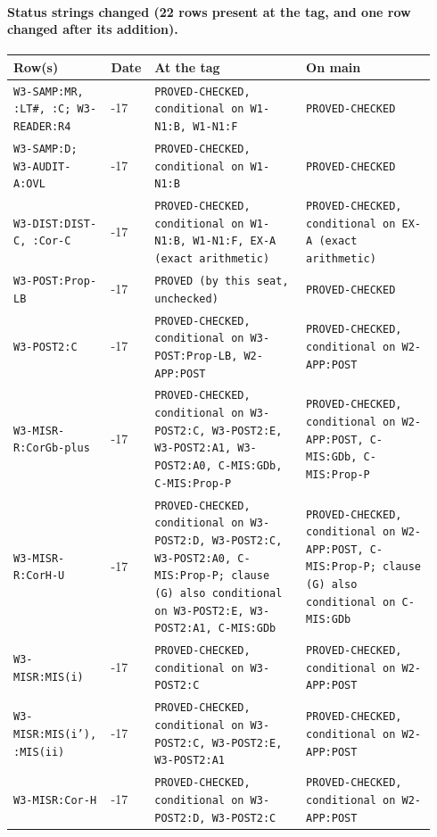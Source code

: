 \paragraph{Status strings changed (22 rows present at the tag, and one row changed after its addition).}
{\footnotesize\begin{longtable}{@{}>{\raggedright\arraybackslash}p{0.22\linewidth}>{\raggedright\arraybackslash}p{0.07\linewidth}>{\raggedright\arraybackslash}p{0.35\linewidth}>{\raggedright\arraybackslash}p{0.3\linewidth}@{}}
\toprule Row(s) & Date & At the tag & On main \\ \midrule
\texttt{W3-SAMP:MR, :LT\#, :C; W3-READER:R4} & 11-17 & \texttt{PROVED-CHECKED, conditional on W1-N1:B, W1-N1:F} & \texttt{PROVED-CHECKED} \\
\texttt{W3-SAMP:D; W3-AUDIT-A:OVL} & 11-17 & \texttt{PROVED-CHECKED, conditional on W1-N1:B} & \texttt{PROVED-CHECKED} \\
\texttt{W3-DIST:DIST-C, :Cor-C} & 11-17 & \texttt{PROVED-CHECKED, conditional on W1-N1:B, W1-N1:F, EX-A (exact arithmetic)} & \texttt{PROVED-CHECKED, conditional on EX-A (exact arithmetic)} \\
\texttt{W3-POST:Prop-LB} & 11-17 & \texttt{PROVED (by this seat, unchecked)} & \texttt{PROVED-CHECKED} \\
\texttt{W3-POST2:C} & 11-17 & \texttt{PROVED-CHECKED, conditional on W3-POST:Prop-LB, W2-APP:POST} & \texttt{PROVED-CHECKED, conditional on W2-APP:POST} \\
\texttt{W3-MISR-R:CorGb-plus} & 11-17 & \texttt{PROVED-CHECKED, conditional on W3-POST2:C, W3-POST2:E, W3-POST2:A1, W3-POST2:A0, C-MIS:GDb, C-MIS:Prop-P} & \texttt{PROVED-CHECKED, conditional on W2-APP:POST, C-MIS:GDb, C-MIS:Prop-P} \\
\texttt{W3-MISR-R:CorH-U} & 11-17 & \texttt{PROVED-CHECKED, conditional on W3-POST2:D, W3-POST2:C, W3-POST2:A0, C-MIS:Prop-P; clause (G) also conditional on W3-POST2:E, W3-POST2:A1, C-MIS:GDb} & \texttt{PROVED-CHECKED, conditional on W2-APP:POST, C-MIS:Prop-P; clause (G) also conditional on C-MIS:GDb} \\
\texttt{W3-MISR:MIS(i)} & 11-17 & \texttt{PROVED-CHECKED, conditional on W3-POST2:C} & \texttt{PROVED-CHECKED, conditional on W2-APP:POST} \\
\texttt{W3-MISR:MIS(i'), :MIS(ii)} & 11-17 & \texttt{PROVED-CHECKED, conditional on W3-POST2:C, W3-POST2:E, W3-POST2:A1} & \texttt{PROVED-CHECKED, conditional on W2-APP:POST} \\
\texttt{W3-MISR:Cor-H} & 11-17 & \texttt{PROVED-CHECKED, conditional on W3-POST2:D, W3-POST2:C} & \texttt{PROVED-CHECKED, conditional on W2-APP:POST} \\

\end{longtable}}
